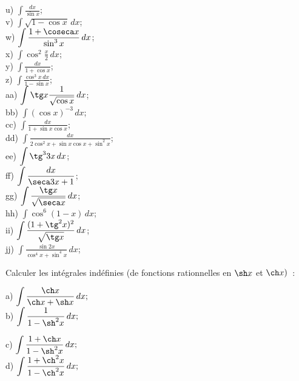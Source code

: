 \documentclass[12pt,french,oneside,a4paper]{memoir} %
\begin{document}
\begin{exo}
\begin{minipage}[t]{8cm}
u) $\displaystyle{\int\frac{dx}{\sin x}}$;\\[2mm]
v) $\displaystyle{\int\sqrt{1-\cos x}\,dx}$;\\[2mm]
w) $\displaystyle{\int\frac{1+\coseca x}{\sin^3 x}\,dx}$;\\[2mm]
x) $\displaystyle{\int\cos^2\frac{x}{2}\,dx}$;\\[2mm]
y) $\displaystyle{\int\frac{dx}{1+\cos x}}$;\\[2mm]
z) $\displaystyle{\int\frac{\cos^3x\,dx}{1-\sin x}}$;\\[2mm]
aa) $\displaystyle{\int\tg x\frac{1}{\sqrt{\cos x}}\,dx}$;\\[2mm]
bb) $\displaystyle{\int(\cos x)^{-3}\,dx}$;\\[2mm]
cc) $\displaystyle{\int\frac{dx}{1+\sin x\cos x}}$;\\[2mm]
dd) $\displaystyle{\int\frac{dx}{2\cos^2 x+\sin x\cos
x+\sin^2x}}$;\\[2mm]
ee) $\displaystyle{\int\tg^33x\,dx}$;\\[2mm]
ff) $\displaystyle{\int\frac{dx}{\seca 3x+1}}$;\\[2mm]
gg) $\displaystyle{\int\frac{\tg
x}{\sqrt{\seca x}}\,dx}$;\\[2mm]  hh)
$\displaystyle{\int\cos^6(1-x)\,dx}$;\\[2mm] ii)
$\displaystyle{\int\frac{(1+\tg^2x)^2}{\sqrt{\tg
x}}\,dx}$;\\[2mm] jj) $\displaystyle{\int\frac{\sin 2x}{\cos^4
x+\sin^4x}\,dx}$;\\[2mm] \end{minipage}
\hfill
\end{exo}
\begin{exo}
Calculer les intégrales indéfinies (de fonctions
rationnelles en $\sh x$ et $\ch x)$~:\\

\hfill
\begin{minipage}[t]{6cm}
a) $\displaystyle{\int\frac{\ch x}{\ch x+\sh
x}\,dx};$\\[4mm]
b) $\displaystyle{\int\frac{1}{1-\sh^2x}\,dx};$\\[2mm]
\end{minipage}
\hfill
\begin{minipage}[t]{8cm}
c) $\displaystyle{\int\frac{1+\ch
x}{1-\sh^2x}\,dx};$\\[4mm]
d) $\displaystyle{\int\frac{1+\ch^2x}{1-\ch^2x}\,dx};$
\end{minipage}
\hfill
\end{exo}
\end{document}
